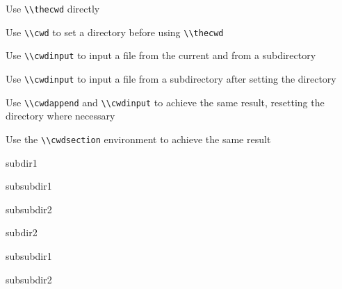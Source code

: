 \documentclass{scrartcl}
\begin{document}
\begin{listingbox}{Use \lstinline{\\thecwd} directly}
    \thecwd
\end{listingbox}

\begin{listingbox}{Use \lstinline{\\cwd} to set a directory before using \lstinline{\\thecwd}}
    \thecwd
\end{listingbox}

\begin{listingbox}{Use \lstinline{\\cwdinput} to input a file from the current and from a subdirectory}
\end{listingbox}

\begin{listingbox}{Use \lstinline{\\cwdinput} to input a file from a subdirectory after setting the directory}
\end{listingbox}

\begin{listingbox}{Use \lstinline{\\cwdappend} and \lstinline{\\cwdinput} to achieve the same result, resetting the directory where necessary}
\end{listingbox}

\begin{listingbox}{Use the \lstinline{\\cwdsection} environment to achieve the same result}
    \begin{cwdsection}{subdir1}
        \begin{cwdsection}{subsubdir1}
        \end{cwdsection}
        \begin{cwdsection}{subsubdir2}
        \end{cwdsection}
    \end{cwdsection}
    \begin{cwdsection}{subdir2}
        \begin{cwdsection}{subsubdir1}
        \end{cwdsection}
        \begin{cwdsection}{subsubdir2}
        \end{cwdsection}
    \end{cwdsection}
\end{listingbox}
\end{document}
